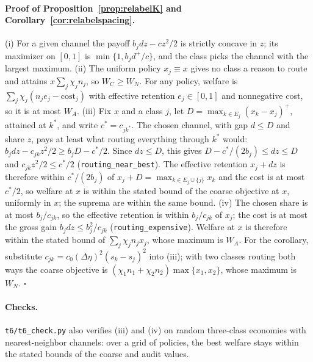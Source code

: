 \documentclass[12pt]{article}
\theoremstyle{definition}
\theoremstyle{remark}
\begin{document}
\paragraph{Proof of Proposition~\ref{prop:relabelK} and Corollary~\ref{cor:relabelspacing}.} (i) For a given channel the payoff $b_jdz-cz^2/2$ is strictly concave in $z$; its maximizer on $[0,1]$ is $\min\{1,b_jd^+/c\}$, and the class picks the channel with the largest maximum. (ii) The uniform policy $x_j\equiv x$ gives no class a reason to route and attains $x\sum_j\chi_jn_j$, so $W_C\ge W_N$. For any policy, welfare is $\sum_j\chi_j(n_je_j-\text{cost}_j)$ with effective retention $e_j\in[0,1]$ and nonnegative cost, so it is at most $W_A$. (iii) Fix $x$ and a class $j$, let $D=\max_{k\in E_j}(x_k-x_j)^+$, attained at $k^*$, and write $c^*=c_{jk^*}$. The chosen channel, with gap $d\le D$ and share $z$, pays at least what routing everything through $k^*$ would: $b_jdz-c_{jk}z^2/2\ge b_jD-c^*/2$. Since $dz\le D$, this gives $D-c^*/(2b_j)\le dz\le D$ and $c_{jk}z^2/2\le c^*/2$ (\nolinkurl{routing_near_best}). The effective retention $x_j+dz$ is therefore within $c^*/(2b_j)$ of $x_j+D=\max_{k\in E_j\cup\{j\}}x_k$ and the cost is at most $c^*/2$, so welfare at $x$ is within the stated bound of the coarse objective at $x$, uniformly in $x$; the suprema are within the same bound. (iv) The chosen share is at most $b_j/c_{jk}$, so the effective retention is within $b_j/c_{jk}$ of $x_j$; the cost is at most the gross gain $b_jdz\le b_j^2/c_{jk}$ (\nolinkurl{routing_expensive}). Welfare at $x$ is therefore within the stated bound of $\sum_j\chi_jn_jx_j$, whose maximum is $W_A$. For the corollary, substitute $c_{jk}=c_0(\Delta\eta)^2(s_k-s_j)^2$ into (iii); with two classes routing both ways the coarse objective is $(\chi_1n_1+\chi_2n_2)\max\{x_1,x_2\}$, whose maximum is $W_N$. $\square$

\paragraph{Checks.} \nolinkurl{t6/t6_check.py} also verifies (iii) and (iv) on random three-class economies with nearest-neighbor channels: over a grid of policies, the best welfare stays within the stated bounds of the coarse and audit values.
\end{document}
